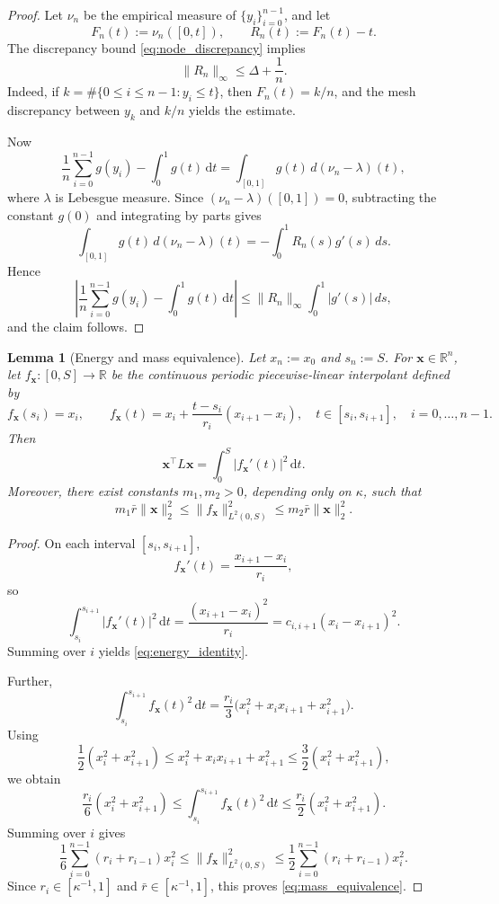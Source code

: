 \documentclass[11pt]{article}
\numberwithin{equation}{section}
\newtheorem{lemma}[theorem]{Lemma}
\theoremstyle{definition}
\theoremstyle{remark}
\begin{document}
\begin{proof}
	Let $\nu_n$ be the empirical measure of $\{y_i\}_{i=0}^{n-1}$, and
	let
	\[
	F_n(t):=\nu_n([0,t]),
	\qquad
	R_n(t):=F_n(t)-t.
	\]
	The discrepancy bound \eqref{eq:node_discrepancy} implies
	\[
	\|R_n\|_\infty\le \Delta+\frac1n.
	\]
	Indeed, if $k=\#\{0\le i\le n-1:y_i\le t\}$, then
	$F_n(t)=k/n$, and the mesh discrepancy between $y_k$ and $k/n$
	yields the estimate.
	
	Now
	\[
	\frac1n\sum_{i=0}^{n-1}g(y_i)-\int_0^1g(t)\,\mathrm dt
	=
	\int_{[0,1]}g(t)\,d(\nu_n-\lambda)(t),
	\]
	where $\lambda$ is Lebesgue measure. Since
	$(\nu_n-\lambda)([0,1])=0$, subtracting the constant $g(0)$ and
	integrating by parts gives
	\[
	\int_{[0,1]}g(t)\,d(\nu_n-\lambda)(t)
	=
	-\int_0^1 R_n(s)g'(s)\,ds.
	\]
	Hence
	\[
	\left|
	\frac1n\sum_{i=0}^{n-1}g(y_i)-\int_0^1g(t)\,\mathrm dt
	\right|
	\le
	\|R_n\|_\infty\int_0^1|g'(s)|\,ds,
	\]
	and the claim follows.
\end{proof}

\begin{lemma}[Energy and mass equivalence]\label{lem:continuous_embed_disc}
	Let $x_n:=x_0$ and $s_n:=S$. For $\boldsymbol{x}\in\mathbb{R}^n$,
	let $f_{\boldsymbol{x}}:[0,S]\to\mathbb{R}$ be the continuous periodic
	piecewise-linear interpolant defined by
	\[
	f_{\boldsymbol{x}}(s_i)=x_i,
	\qquad
	f_{\boldsymbol{x}}(t)=x_i+\frac{t-s_i}{r_i}(x_{i+1}-x_i),
	\quad t\in[s_i,s_{i+1}],
	\quad i=0,\dots,n-1.
	\]
	Then
	\begin{equation}\label{eq:energy_identity}
		\boldsymbol{x}^\top L\boldsymbol{x}
		=
		\int_0^S|f_{\boldsymbol{x}}'(t)|^2\,\mathrm dt.
	\end{equation}
	Moreover, there exist constants $m_1,m_2>0$, depending only on
	$\kappa$, such that
	\begin{equation}\label{eq:mass_equivalence}
		m_1\bar r\|\boldsymbol{x}\|_2^2
		\le \|f_{\boldsymbol{x}}\|_{L^2(0,S)}^2
		\le m_2\bar r\|\boldsymbol{x}\|_2^2.
	\end{equation}
\end{lemma}

\begin{proof}
	On each interval $[s_i,s_{i+1}]$,
	\[
	f_{\boldsymbol{x}}'(t)=\frac{x_{i+1}-x_i}{r_i},
	\]
	so
	\[
	\int_{s_i}^{s_{i+1}}|f_{\boldsymbol{x}}'(t)|^2\,\mathrm dt
	=
	\frac{(x_{i+1}-x_i)^2}{r_i}
	=
	c_{i,i+1}(x_i-x_{i+1})^2.
	\]
	Summing over $i$ yields \eqref{eq:energy_identity}.
	
	Further,
	\[
	\int_{s_i}^{s_{i+1}}f_{\boldsymbol{x}}(t)^2\,\mathrm dt
	=
	\frac{r_i}{3}\bigl(x_i^2+x_ix_{i+1}+x_{i+1}^2\bigr).
	\]
	Using
	\[
	\frac12(x_i^2+x_{i+1}^2)
	\le x_i^2+x_ix_{i+1}+x_{i+1}^2
	\le \frac32(x_i^2+x_{i+1}^2),
	\]
	we obtain
	\[
	\frac{r_i}{6}(x_i^2+x_{i+1}^2)
	\le
	\int_{s_i}^{s_{i+1}}f_{\boldsymbol{x}}(t)^2\,\mathrm dt
	\le
	\frac{r_i}{2}(x_i^2+x_{i+1}^2).
	\]
	Summing over $i$ gives
	\[
	\frac{1}{6}\sum_{i=0}^{n-1}(r_i+r_{i-1})x_i^2
	\le
	\|f_{\boldsymbol{x}}\|_{L^2(0,S)}^2
	\le
	\frac{1}{2}\sum_{i=0}^{n-1}(r_i+r_{i-1})x_i^2.
	\]
	Since $r_i\in[\kappa^{-1},1]$ and $\bar r\in[\kappa^{-1},1]$, this
	proves \eqref{eq:mass_equivalence}.
\end{proof}
\end{document}
